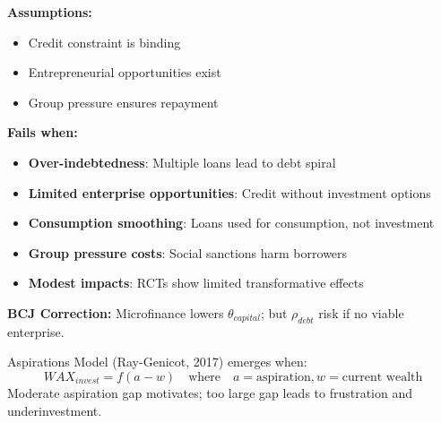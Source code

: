 \begin{tcolorbox}[colback=red!5!white, colframe=red!75!black, title=Boundary Condition: Where Microfinance Fails]
\textbf{Assumptions:}
\begin{itemize}[nosep]
\item Credit constraint is binding
\item Entrepreneurial opportunities exist
\item Group pressure ensures repayment
\end{itemize}

\textbf{Fails when:}
\begin{itemize}[nosep]
\item \textbf{Over-indebtedness}: Multiple loans lead to debt spiral
\item \textbf{Limited enterprise opportunities}: Credit without investment options
\item \textbf{Consumption smoothing}: Loans used for consumption, not investment
\item \textbf{Group pressure costs}: Social sanctions harm borrowers
\item \textbf{Modest impacts}: RCTs show limited transformative effects
\end{itemize}

\textbf{BCJ Correction:} Microfinance lowers $\theta_{capital}$; but $\rho_{debt}$ risk if no viable enterprise.
\end{tcolorbox}


\begin{theorem}
\label{thm:aspirations}
Aspirations Model (Ray-Genicot, 2017) emerges when:
\begin{equation}
\boxed{WAX_{invest} = f(a - w) \quad \text{where} \quad a = \text{aspiration}, w = \text{current wealth}}
\end{equation}
Moderate aspiration gap motivates; too large gap leads to frustration and underinvestment.
\end{theorem}

